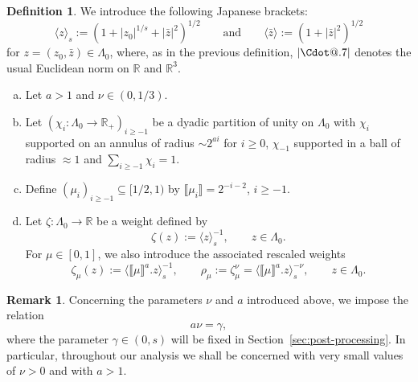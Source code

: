 \documentclass{article}
\makeatletter
\numberwithin{equation}{section}
\newcommand{\assign}{:=}
\newcommand*\Cdot{{\mathpalette\Cdot@{.7}}}
\newcommand*\Cdot@[2]{\mathbin{\vcenter{\hbox{\scalebox{#2}{\hspace{0.1mm}$\m@th#1\bullet$\hspace{0.1mm}}}}}}
\theoremstyle{plain}
\theoremstyle{definition}
\newtheorem{definition}[theorem]{Definition}
\newtheorem{remark}[theorem]{Remark}
\makeatother
\begin{document}
\begin{definition}
  \label{def:weights}We introduce the following Japanese brackets:
  \begin{equation}
    \langle z \rangle_s \assign (1 + | z_0 |^{1 / s} + | \bar{z} |^2)^{1 / 2}
    \qquad \text{and} \qquad \langle \bar{z} \rangle \assign (1 + | \bar{z}
    |^2)^{1 / 2}
    \label{eq:Japanese}
  \end{equation}
  for $z = (z_0, \bar{z}) \in \Lambda_0$, where, as in the previous definition, $| \Cdot |$ denotes the usual
  Euclidean norm on $\mathbb{R}$ and $\mathbb{R}^3$.
  \begin{enumerate}[(a)]
    \item Let $a > 1$ and $\nu \in (0, 1 / 3)$.
    
    \item Let $(\chi_i : \Lambda_0 \rightarrow \mathbb{R}_+)_{i \geqslant -
    1}$ be a dyadic partition of unity on $\Lambda_0$ with $\chi_i$ supported
    on an annulus of radius $\sim 2^{ai}$ for $i \geqslant 0$, $\chi_{- 1}$
    supported in a ball of radius $\approx 1$ and $\sum_{i \geqslant - 1}
    \chi_i = 1$.
    
    \item Define $(\mu_i)_{i \geqslant - 1} \subseteq [1 / 2, 1)$ by
    $\llbracket \mu_i \rrbracket = 2^{- i - 2}$, $i \geqslant - 1$.
    
    \item Let $\zeta : \Lambda_0 \rightarrow \mathbb{R}$ be a weight defined
    by
    \[ \zeta (z) \assign \langle z \rangle_s^{- 1}, \qquad z \in \Lambda_0 .
    \]
    For $\mu \in [0, 1]$, we also introduce the associated rescaled weights
    \[ \zeta_{\mu} (z) \assign \langle \llbracket \mu \rrbracket^a .z
       \rangle_s^{- 1}, \qquad \rho_{\mu} \assign \zeta_{\mu}^{\nu} = \langle
       \llbracket \mu \rrbracket^a .z \rangle_s^{- \nu}, \qquad z \in
       \Lambda_0 . \]
  \end{enumerate}
\end{definition}

\begin{remark}
  Concerning the parameters $\nu$ and $a$ introduced above, we impose the
  relation
  \begin{equation}
   a \nu = \gamma, \label{eq:a-nu-gamma}
  \end{equation}
  where the parameter $\gamma \in (0,s)$ will be fixed in
  Section~\ref{sec:post-processing}. In particular, throughout our analysis we
  shall be concerned with very small values of $\nu > 0$ and with $a > 1$.
\end{remark}
\end{document}
